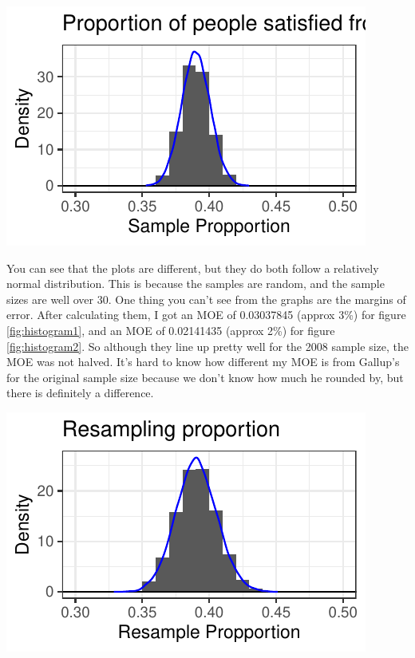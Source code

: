 \documentclass{article}\usepackage[]{graphicx}\usepackage[]{xcolor}
\newenvironment{Figure}
  {\par\medskip\noindent\minipage{\linewidth}}
  {\endminipage\par\medskip}
\begin{document}
\begin{multicols}{2}
\begin{Figure}
\includegraphics{Histogram2.pdf}
\label{fig:histogram2}
\end{Figure}

You can see that the plots are different, but they do both follow a relatively normal distribution. This is because the samples are random, and the sample sizes are well over 30. One thing you can't see from the graphs are the margins of error. After calculating them, I got an MOE of 0.03037845 (approx 3\%) for figure \ref{fig:histogram1}, and an MOE of 0.02141435 (approx 2\%) for figure \ref{fig:histogram2}. So although they line up pretty well for the 2008 sample size, the MOE was not halved. It's hard to know how different my MOE is from Gallup's for the original sample size because we don't know how much he rounded by, but there is definitely a difference.

\begin{Figure}
\includegraphics{Resampling.pdf}
\label{fig:resampling}
\end{Figure}

\end{multicols}
\end{document}
